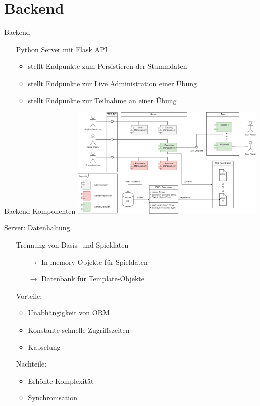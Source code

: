 \section{Backend}


\begin{frame}{Backend}
	\begin{itemize}
		\item[] Python Server mit Flask API
		\begin{itemize}
			\itemsep 4pt
			\item stellt Endpunkte zum Persistieren der Stammdaten
			\item stellt Endpunkte zur Live Administration einer Übung
			\item stellt Endpunkte zur Teilnahme an einer Übung
		\end{itemize}
	\end{itemize}
\end{frame}


\begin{frame}{Backend-Komponenten}
	\centering
	\includegraphics[width=0.7\textwidth]{images/server/component_diagram.png}
\end{frame}


\begin{frame}{Server: Datenhaltung}
	\begin{itemize}
		\itemsep 12pt
		\item[] Trennung von Basis- und Spieldaten
		\begin{itemize}
			\itemsep 2pt
			\item[$\rightarrow$] In-memory Objekte für Spieldaten
			\item[$\rightarrow$] Datenbank für Template-Objekte   
		\end{itemize}
		\item[] Vorteile:
		\begin{itemize}
			\itemsep 2pt
			\item Unabhängigkeit von ORM
			\item Konstante schnelle Zugriffszeiten
			\item Kapselung
		\end{itemize}
		\item[] Nachteile:
		\begin{itemize}
			\itemsep 2pt
			\item Erhöhte Komplexität
			\item Synchronisation
		\end{itemize}
	\end{itemize}
\end{frame}


